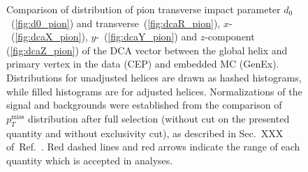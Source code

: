 \begin{figure}[ht]
{  \begin{subfigure}[b]{\linewidth}\addtocounter{subfigure}{1}
  \end{subfigure}
  \begin{minipage}[t][1.042\linewidth][t]{\linewidth}\vspace{10pt}
    \caption[Comparison of distribution of pion $d_{0}$ and components of DCA vector in the data and embedded MC, before and after adjustment of TPC pointing resolution.]
    {Comparison of distribution of pion transverse impact parameter $d_{0}$~(\ref{fig:d0_pion}) and transverse~(\ref{fig:dcaR_pion}), $x$-~(\ref{fig:dcaX_pion}), $y$-~(\ref{fig:dcaY_pion}) and $z$-component (\ref{fig:dcaZ_pion}) of the DCA vector between the global helix and primary vertex in the data (CEP) and embedded MC (GenEx). Distributions for unadjusted helices are drawn as hashed histograms, while filled histograms are for adjusted helices. Normalizations of the signal and backgrounds were established from the comparison of $p_{T}^{\textrm{miss}}$ distribution after full selection (without cut on the presented quantity and without exclusivity cut), as described in Sec.~XXX of~Ref.~\cite{AnalysisNoteRafal}. Red dashed lines and red arrows indicate the range of each quantity which is accepted in analyses.}\label{fig:pointingResComp_pion}
  \end{minipage}
}%

\end{figure}




